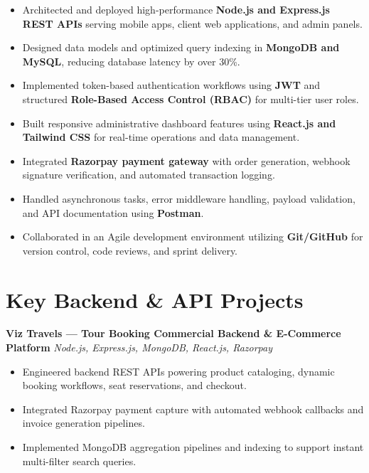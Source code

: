 \documentclass[a4paper,10pt]{article}
\begin{document}
\begin{itemize}

    \item Architected and deployed high-performance \textbf{Node.js and Express.js REST APIs} serving mobile apps, client web applications, and admin panels.

    \item Designed data models and optimized query indexing in \textbf{MongoDB and MySQL}, reducing database latency by over 30\%.

    \item Implemented token-based authentication workflows using \textbf{JWT} and structured \textbf{Role-Based Access Control (RBAC)} for multi-tier user roles.

    \item Built responsive administrative dashboard features using \textbf{React.js and Tailwind CSS} for real-time operations and data management.

    \item Integrated \textbf{Razorpay payment gateway} with order generation, webhook signature verification, and automated transaction logging.

    \item Handled asynchronous tasks, error middleware handling, payload validation, and API documentation using \textbf{Postman}.

    \item Collaborated in an Agile development environment utilizing \textbf{Git/GitHub} for version control, code reviews, and sprint delivery.

\end{itemize}

\section*{Key Backend \& API Projects}

\textbf{Viz Travels --- Tour Booking Commercial Backend \& E-Commerce Platform}
\hfill
\textit{Node.js, Express.js, MongoDB, React.js, Razorpay}

\begin{itemize}

    \item Engineered backend REST APIs powering product cataloging, dynamic booking workflows, seat reservations, and checkout.

    \item Integrated Razorpay payment capture with automated webhook callbacks and invoice generation pipelines.

    \item Implemented MongoDB aggregation pipelines and indexing to support instant multi-filter search queries.

\end{itemize}
\end{document}
